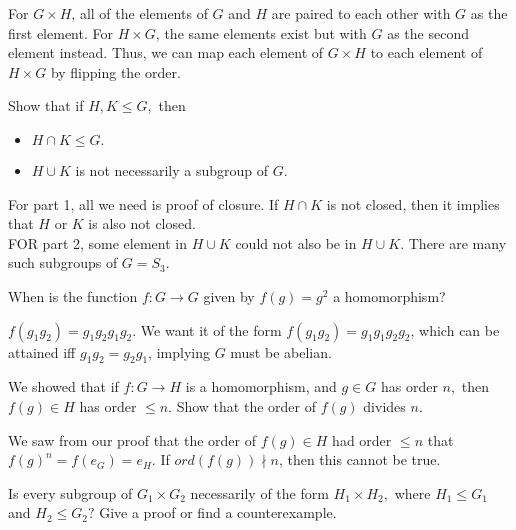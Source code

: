 \documentclass{scrartcl}
\begin{document}
\begin{soln}
	For $G \times H$, all of the elements of $G$ and $H$ are paired to each other with $G$ as the first element. For $H \times G$, the same elements exist but with $G$ as the second element instead. Thus, we can map each element of $G \times H$ to each element of $H \times G$ by flipping the order.
\end{soln}

\begin{problem}[3]
    Show that if $H, K \le G,$ then
    \begin{itemize}
        \item $H \cap K \le G.$ 
        \item $H \cup K$ is not necessarily a subgroup of $G.$
    \end{itemize}
\end{problem}

\begin{soln}
    For part 1, all we need is proof of closure. If $H \cap K$ is not closed, then it implies that $H$ or $K$ is also not closed. \\
    FOR part 2, some element in $H \cup K$ could not also be in $H \cup K$. There are many such subgroups of $G = S_3$.
\end{soln}

\begin{problem}[4]
    When is the function $f : G \to G$ given by $f(g) = g^2$ a homomorphism?
\end{problem}

\begin{soln}
    $f(g_1g_2) = g_1g_2g_1g_2$. We want it of the form $f(g_1g_2) = g_1g_1g_2g_2$, which can be attained iff $g_1g_2 = g_2g_1$, implying $G$ must be abelian.
\end{soln}

\begin{problem}[5]
    We showed that if $f : G \to H$ is a homomorphism, and $g \in G$ has order $n,$ then $f(g) \in H$ has order $\le n.$ Show that the order of $f(g)$ divides $n.$
\end{problem}

\begin{soln}
    We saw from our proof that the order of $f(g) \in H$ had order $\le n$ that $f(g)^n = f(e_G) = e_H$. If $ord(f(g)) \nmid n$, then this cannot be true.
\end{soln}

\begin{problem}[6]
    Is every subgroup of $G_1 \times G_2$ necessarily of the form $H_1 \times H_2,$ where $H_1 \leq G_1$ and $H_2 \le G_2?$ Give a proof or find a counterexample.
\end{problem}
\end{document}
